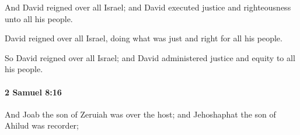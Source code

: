 			\begin{versebox}
					\item[BHS] 
					\item[ASV] And David reigned over all Israel; and David executed justice and righteousness unto all his people.
					\item[NIV] David reigned over all Israel, doing what was just and right for all his people.
					\item[NRSV] So David reigned over all Israel; and David administered justice and equity to all his people.
			\end{versebox}

		\paragraph{2 Samuel 8:16} %
			\label{2SAMUEL-8-16}

			And Joab the son of Zeruiah was over the host; and Jehoshaphat the son of Ahilud was recorder;

